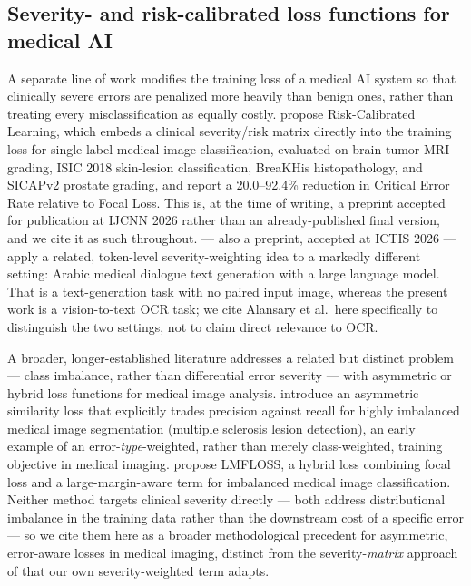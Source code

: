 \documentclass[fleqn,10pt]{wlpeerj}
\begin{document}
\subsection*{Severity- and risk-calibrated loss functions for medical AI}\label{sec:related-severity}

A separate line of work modifies the training loss of a medical AI system so that clinically severe errors are penalized more heavily than benign ones, rather than treating every misclassification as equally costly. \citet{mohammadiseif2026risk} propose Risk-Calibrated Learning, which embeds a clinical severity/risk matrix directly into the training loss for single-label medical image classification, evaluated on brain tumor MRI grading, ISIC 2018 skin-lesion classification, BreaKHis histopathology, and SICAPv2 prostate grading, and report a 20.0--92.4\% reduction in Critical Error Rate relative to Focal Loss. This is, at the time of writing, a preprint accepted for publication at IJCNN 2026 rather than an already-published final version, and we cite it as such throughout. \citet{alansary2026severity} --- also a preprint, accepted at ICTIS 2026 --- apply a related, token-level severity-weighting idea to a markedly different setting: Arabic medical dialogue text generation with a large language model. That is a text-generation task with no paired input image, whereas the present work is a vision-to-text OCR task; we cite Alansary et al.\ here specifically to distinguish the two settings, not to claim direct relevance to OCR.

A broader, longer-established literature addresses a related but distinct problem --- class imbalance, rather than differential error severity --- with asymmetric or hybrid loss functions for medical image analysis. \citet{hashemi2019asymmetric} introduce an asymmetric similarity loss that explicitly trades precision against recall for highly imbalanced medical image segmentation (multiple sclerosis lesion detection), an early example of an error-\emph{type}-weighted, rather than merely class-weighted, training objective in medical imaging. \citet{sadi2022lmfloss} propose LMFLOSS, a hybrid loss combining focal loss and a large-margin-aware term for imbalanced medical image classification. Neither method targets clinical severity directly --- both address distributional imbalance in the training data rather than the downstream cost of a specific error --- so we cite them here as a broader methodological precedent for asymmetric, error-aware losses in medical imaging, distinct from the severity-\emph{matrix} approach of \citet{mohammadiseif2026risk} that our own severity-weighted term adapts.
\end{document}
